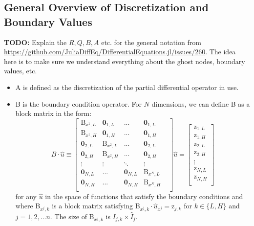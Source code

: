 \documentclass[11pt]{article}
\begin{document}
\subsection{General Overview of Discretization and Boundary Values}\label{sec:general}
\textbf{TODO:} Explain the $R, Q, B, A$ etc. for the general notation from \url{https://github.com/JuliaDiffEq/DifferentialEquations.jl/issues/260}.  The idea here is to make sure we understand everything about the ghost nodes, boundary values, etc.
\begin{itemize}
	\item A is defined as the discretization of the partial differential operator in use.
	
	\item B is the boundary condition operator. For $N$ dimensions, we can define B as a block matrix in the form:
	\begin{equation}
		B\cdot \hat{u} \equiv 
		\begin{bmatrix}
			\text{B}_{x^{1},L} & \mathbf{0}_{1,L}       & ...    & \mathbf{0}_{1,L}\\
			\text{B}_{x^{1},H} & \mathbf{0}_{1,H}       & ...    & \mathbf{0}_{1,H}\\
			\mathbf{0}_{2,L}   & \text{B}_{x^{2},L} &   ...    & \mathbf{0}_{2,L}\\
			\mathbf{0}_{2,H}   & \text{B}_{x^{2},H} &   ...    & \mathbf{0}_{2,H}\\
			\vdots  & \vdots  & \ddots & \vdots \\
			\mathbf{0}_{N,L}       & ...    & \mathbf{0}_{N,L} & \text{B}_{x^{N},L} & \\
			\mathbf{0}_{N,H}       & ...    & \mathbf{0}_{N,H} & \text{B}_{x^{N},H} & \\
		\end{bmatrix}
		\hat{u}
		=
		\begin{bmatrix}
			\text{z}_{{1},L}\\
			\text{z}_{{1},H}\\
			\text{z}_{{2},L}\\
			\text{z}_{{2},H}\\
			\vdots\\
			\text{z}_{{N},L}\\
			\text{z}_{{N},H}\\
		\end{bmatrix}
		\label{B_operator_block}
	\end{equation}
	for any $\hat{u}$ in the space of functions that satisfy the boundary conditions and where B$_{x^j,k}$ is a block matrix satisfying B$_{x^j,k}\cdot \hat{u}_{x^j} = \text{z}_{j,k}$ for $k \in \{L,H\}$ and $j = 1, 2,\dots n$. The size of B$_{x^j,k}$ is $I_{j,k} \times \hat{I}_j$.
	

\end{itemize}
\end{document}
